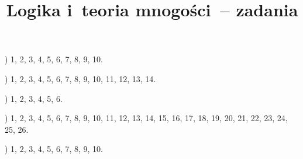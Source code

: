 \documentclass[a4paper,11pt]{article}
\title{Logika i~teoria mnogości~-- zadania}
\begin{document}





\maketitle  %







\noindent
{}) 1, 2, 3, 4, 5, 6, 7, 8, 9, 10.

\vspace{\spaceFour}



\noindent
{}) 1, 2, 3, 4, 5, 6, 7, 8, 9, 10, 11, 12, 13, 14.

\vspace{\spaceFour}



\noindent
{}) 1, 2, 3, 4, 5, 6.

\vspace{\spaceFour}



\noindent
{}) 1, 2, 3, 4, 5, 6, 7, 8, 9, 10, 11, 12, 13, 14, 15, 16,
17, 18, 19, 20, 21, 22, 23, 24, 25, 26.

\vspace{\spaceFour}



\noindent
{}) 1, 2, 3, 4, 5, 6, 7, 8, 9, 10.
\end{document}
